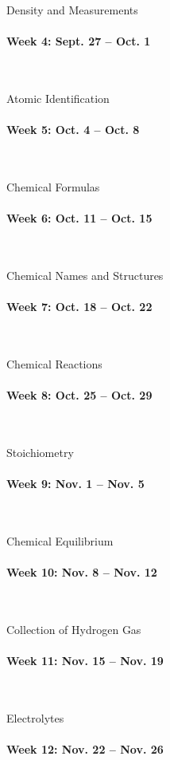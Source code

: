 \documentclass[12pt, letterpaper]{article}
\begin{document}
Density and Measurements

\paragraph{Week 4: Sept. 27 -- Oct. 1}~

Atomic Identification

\paragraph{Week 5: Oct. 4 -- Oct. 8}~

Chemical Formulas

\paragraph{Week 6: Oct. 11 -- Oct. 15}~ 

Chemical Names and Structures

\paragraph{Week 7: Oct. 18 -- Oct. 22}~

Chemical Reactions

\paragraph{Week 8: Oct. 25 -- Oct. 29}~ 

Stoichiometry

\paragraph{Week 9: Nov. 1 -- Nov. 5}~

Chemical Equilibrium

\paragraph{Week 10: Nov. 8 -- Nov. 12}~ 

Collection of Hydrogen Gas

\paragraph{Week 11: Nov. 15 -- Nov. 19}~

Electrolytes

\paragraph{Week 12: Nov. 22 -- Nov. 26}~
\end{document}
